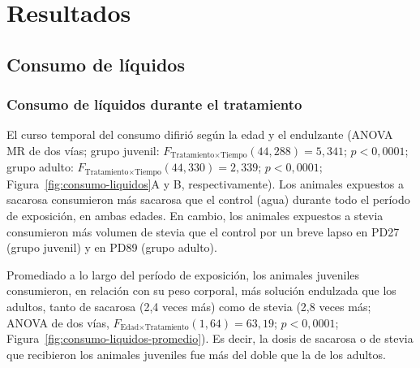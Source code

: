\chapter{Resultados}\label{cap:resultados}

\section{Consumo de líquidos}\label{sec:res-consumo}

\subsection{Consumo de líquidos durante el tratamiento}\label{sec:res-consumo-tratamiento}

El curso temporal del consumo difirió según la edad y el endulzante (ANOVA MR de dos vías; grupo juvenil: $F_{\text{Tratamiento} \times \text{Tiempo}}(44, 288) = 5{,}341$; $p < 0{,}0001$; grupo adulto: $F_{\text{Tratamiento} \times \text{Tiempo}}(44, 330) = 2{,}339$; $p < 0{,}0001$; Figura~\ref{fig:consumo-liquidos}A y B, respectivamente). Los animales expuestos a sacarosa consumieron más sacarosa que el control (agua) durante todo el período de exposición, en ambas edades. En cambio, los animales expuestos a stevia consumieron más volumen de stevia que el control por un breve lapso en PD27 (grupo juvenil) y en PD89 (grupo adulto).

Promediado a lo largo del período de exposición, los animales juveniles consumieron, en relación con su peso corporal, más solución endulzada que los adultos, tanto de sacarosa (2,4 veces más) como de stevia (2,8 veces más; ANOVA de dos vías, $F_{\text{Edad} \times \text{Tratamiento}}(1, 64) = 63{,}19$; $p < 0{,}0001$; Figura~\ref{fig:consumo-liquidos-promedio}). Es decir, la dosis de sacarosa o de stevia que recibieron los animales juveniles fue más del doble que la de los adultos.

